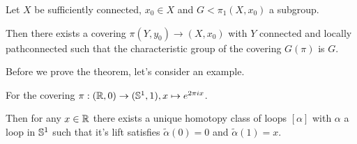 
\begin{thm} \label{thm:existence-theorem}
  Let $X$ be sufficiently connected, $x_0 \in X$ and $G < \pi_1(X,x_0)$ a subgroup.
  
  Then there exists a covering $\pi(Y,y_0) \to  (X,x_0)$ with $Y$ connected and locally pathconnected such that the characteristic group of the covering $G(\pi)$ is $G$.
\end{thm}

Before we prove the theorem, let's consider an example.

For the covering $\pi: (\mathbb{R},0) \to (\mathbb{S}^{1},1), x \mapsto  e^{2 \pi i x}$.

Then for any $x \in \mathbb{R}$ there exists a unique homotopy class of loops $[\alpha]$ with $\alpha$ a loop in $\mathbb{S}^{1}$ such that it's lift satisfies $\tilde{\alpha}(0) = 0$ and $\tilde{\alpha}(1) = x$.


